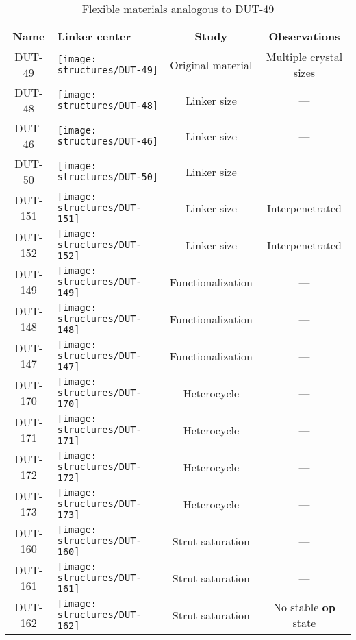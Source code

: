 \begin{table}[p]
    \centering %
	\caption{Flexible materials analogous to DUT-49}
    \small
	\begin{tabular}{c>{\centering\arraybackslash} m{6cm}cc}
		\toprule
	    \textbf{Name}
        & \textbf{Linker center}
        & \textbf{Study}
        & \textbf{Observations} \\
		\midrule
        DUT-49  & 
            \texttt{[image: structures/DUT-49]}
            & Original material & Multiple crystal sizes \\
            \midrule    
        DUT-48  & 
            \texttt{[image: structures/DUT-48]}
            & Linker size & --- \\
        DUT-46  & 
            \texttt{[image: structures/DUT-46]}
            & Linker size & --- \\
        DUT-50  & 
            \texttt{[image: structures/DUT-50]}
            & Linker size & --- \\
        DUT-151  & 
            \texttt{[image: structures/DUT-151]} 
            & Linker size & Interpenetrated \\
        DUT-152  & 
            \texttt{[image: structures/DUT-152]}
            & Linker size & Interpenetrated \\
            \midrule
        DUT-149  & 
            \texttt{[image: structures/DUT-149]}
            & Functionalization & --- \\
        DUT-148  & 
            \texttt{[image: structures/DUT-148]}
            & Functionalization & --- \\
        DUT-147  & 
            \texttt{[image: structures/DUT-147]}
            & Functionalization & --- \\
            \midrule
            DUT-170  & 
            \texttt{[image: structures/DUT-170]}
            & Heterocycle & --- \\
            DUT-171  & 
            \texttt{[image: structures/DUT-171]}
            & Heterocycle & --- \\
            DUT-172  & 
            \texttt{[image: structures/DUT-172]}
            & Heterocycle & --- \\
            DUT-173  & 
            \texttt{[image: structures/DUT-173]}
            & Heterocycle & --- \\
        \midrule
        DUT-160  & 
            \texttt{[image: structures/DUT-160]}
            & Strut saturation & --- \\
        DUT-161  & 
            \texttt{[image: structures/DUT-161]}
            & Strut saturation & --- \\
        DUT-162  & 
            \texttt{[image: structures/DUT-162]}
            & Strut saturation & No stable \textbf{op} state \\
        \bottomrule
	\end{tabular}%
	\label{dut:tab:materials}
\end{table}%

